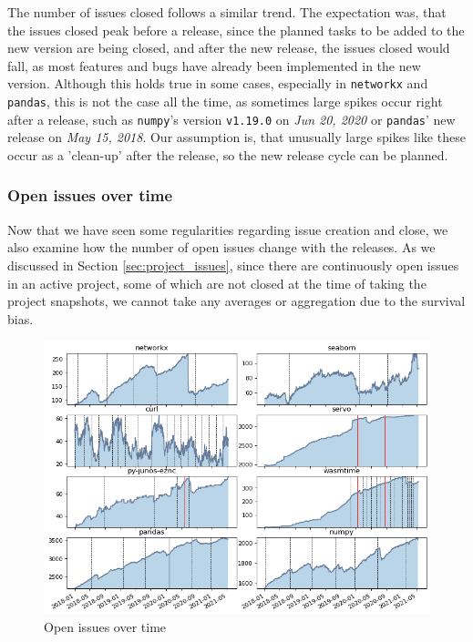 The number of issues closed follows a similar trend. The expectation was, that the issues closed peak before a release, since the planned tasks to be added to the new version are being closed, and after the new release, the issues closed would fall, as most features and bugs have already been implemented in the new version. Although this holds true in some cases, especially in \texttt{networkx} and \texttt{pandas}, this is not the case all the time, as sometimes large spikes occur right after a release, such as \texttt{numpy}'s version \texttt{v1.19.0} on \textit{Jun 20, 2020} or \texttt{pandas}' new release on \textit{May 15, 2018}. Our assumption is, that unusually large spikes like these occur as a 'clean-up' after the release, so the new release cycle can be planned.

\subsubsection{Open issues over time}

Now that we have seen some regularities regarding issue creation and close, we also examine how the number of open issues change with the releases. As we discussed in Section \ref{sec:project_issues}, since there are continuously open issues in an active project, some of which are not closed at the time of taking the project snapshots, we cannot take any averages or aggregation due to the survival bias.

\begin{figure}
    \centering
    \includegraphics[width=\textwidth]{figures/qualitative/issues_closed_created/open_issues.png}
    \caption{Open issues over time}
    \label{fig:open_issues}
\end{figure}

